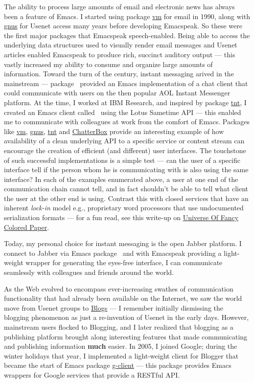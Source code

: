 \documentclass[11pt]{article}
\begin{document}
The ability to process large amounts of email and electronic news
has always been a feature of Emacs. I started using package \uline{vm}
for email in 1990, along with \uline{gnus} for Usenet access many years
before developing Emacspeak. So these were the first major
packages that Emacspeak speech-enabled. Being able to access the
underlying data structures used to visually render email messages
and Usenet articles enabled Emacspeak to produce rich, succinct
auditory output — this vastly increased my ability to consume and
organize large amounts of information. Toward the turn of the
century, instant messaging arived in the mainstream — package
$_{\text{ }}$provided an Emacs implementation of a chat client that
could communicate with users on the then popular AOL Instant
Messenger platform. At the time, I worked at IBM Research, and
inspired by package \uline{tnt}, I created an Emacs client called
$_{\text{ }}$using the Lotus Sametime API — this enabled me to
communicate with colleagues at work from the comfort of
Emacs. Packages like \uline{vm}, \uline{gnus}, \uline{tnt} and \uline{ChatterBox} provide
an interesting example of how availability of a clean underlying
API to a specific service or content stream can encourage the
creation of efficient (and different) user interfaces. The
touchstone of such successful implementations is a simple test —
can the user of a specific interface tell if the person whom he
is communicating with is also using the same interface? In each
of the examples enumerated above, a user at one end of the
communication chain cannot tell, and in fact shouldn't be able to
tell what client the user at the other end is using. Contrast
this with closed services that have an inherent \emph{lock-in} model
e.g., proprietary word processors that use undocumented
serialization formats — for a fun read, see this write-up on
\href{http://emacspeak.sourceforge.net/publications/colored-paper.html}{Universe
Of Fancy Colored Paper}.


Today, my personal choice for instant messaging is the open
Jabber platform. I connect to Jabber via Emacs package
$_{\text{ }}$and with Emacspeak providing a light-weight
wrapper for generating the eyes-free interface, I can communicate
seamlessly with colleagues and friends around the world.

As the Web evolved to encompass ever-increasing swathes of
communication functionality that had already been available on
the Internet, we saw the world move from Usenet groups to \uline{Blogs}
— I remember initially dismissing the blogging phenomenon as just
a re-invention of Usenet in the early days. However, mainstream
users flocked to Blogging, and I later realized that blogging as
a publishing platform brought along interesting features that
made communicating and publishing information \textbf{much} easier. In
2005, I joined Google; during the winter holidays that year, I
implemented a light-weight client for Blogger that became the
start of Emacs package \uline{g-client} — this package provides Emacs
wrappers for Google services that provide a RESTful API.
\end{document}
